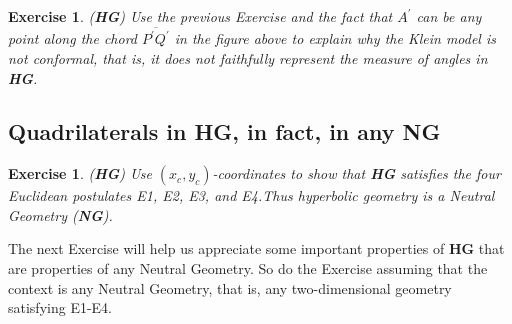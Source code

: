 \documentclass{article}%
\newtheorem{exercise}[theorem]{Exercise}
\begin{document}
\begin{exercise}
(\textbf{HG}) Use the previous Exercise and the fact that $A^{\prime}$ can be
any point along the chord $\overline{P^{\prime}Q^{\prime}}$ in the figure
above to explain why the Klein model is not conformal, that is, it does not
faithfully represent the measure of angles in \textbf{HG}.\pagebreak
\end{exercise}

\subsection{Quadrilaterals in HG, in fact, in any NG}

\begin{exercise}
(\textbf{HG}) Use $\left(  x_{c},y_{c}\right)  $-coordinates to show that
\textbf{HG} satisfies the four Euclidean postulates E1, E2, E3, and E4.Thus
hyperbolic geometry is a Neutral Geometry (\textbf{NG}).
\end{exercise}

The next Exercise will help us appreciate some important properties of
\textbf{HG }that are properties of any Neutral Geometry. So do the Exercise
assuming that the context is any Neutral Geometry, that is, any
two-dimensional geometry satisfying E1-E4.
\end{document}
